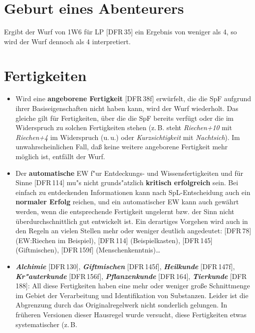 \documentclass[10pt,a4paper,germanpar]{article}
\begin{document}
\section{Geburt eines Abenteurers}

Ergibt der Wurf von 1W6 für LP [DFR\,35] ein Ergebnis von weniger als
4, so wird der Wurf dennoch als 4 interpretiert.

\section{Fertigkeiten}

\begin{itemize}
\item Wird eine \textbf{angeborene Fertigkeit} [DFR\,38f] erwürfelt,
  die die SpF aufgrund ihrer Basiseigenschaften nicht haben kann, wird
  der Wurf wiederholt. Das gleiche gilt für Fertigkeiten, über die die
  SpF bereits verfügt oder die im Widerspruch zu solchen Fertigkeiten
  stehen (z.\,B. steht \emph{Riechen+10} mit \emph{Riechen+4} im
  Widerspruch (u.\,u.) oder \emph{Kurzsichtigkeit} mit
  \emph{Nachtsich}). Im unwahrscheinlichen Fall, daß keine weitere
  angeborene Fertigkeit mehr möglich ist, entfällt der Wurf.
\item Der \textbf{automatische} EW f"ur Entdeckungs- und Wissensfertigkeiten
  und für Sinne [DFR\,114] mu"s nicht grunds"atzlich \textbf{kritisch
    erfolgreich} sein. Bei einfach zu entdeckenden Informationen kann nach
  SpL-Ent\-schei\-dung auch ein \textbf{normaler Erfolg} reichen, und ein
  automatischer EW kann auch gewährt werden, wenn die entsprechende Fertigkeit
  ungelernt bzw. der Sinn nicht überdurchschnittlich gut entwickelt ist. Ein
  derartiges Vorgehen wird auch in den Regeln an vielen Stellen mehr oder
  weniger deutlich angedeutet: [DFR\,78] (EW:Riechen im Beispiel), [DFR\,114]
  (Beispielkasten), [DFR\,145] (Giftmischen), [DFR\,159f]
  (Menschenkenntnis)\dots
\item \textbf{\emph{Alchimie}} [DFR\,130], \textbf{\emph{Giftmischen}}
  [DFR\,145f], \textbf{\emph{Heilkunde}} [DFR\,147f],
  \textbf{\emph{Kr"auterkunde}} [DFR\,156f], \textbf{\emph{Pflanzenkunde}}
  [DFR\,164], \textbf{\emph{Tierkunde}} [DFR\,188]: All diese Fertigkeiten
  haben eine mehr oder weniger große Schnittmenge im Gebiet der Verarbeitung
  und Identifikation von Substanzen. Leider ist die Abgrenzung durch das
  Originalregelwerk nicht sonderlich gelungen. In früheren Versionen dieser
  Hausregel wurde versucht, diese Fertigkeiten etwas systematischer (z.\,B.

\end{itemize}
\end{document}
